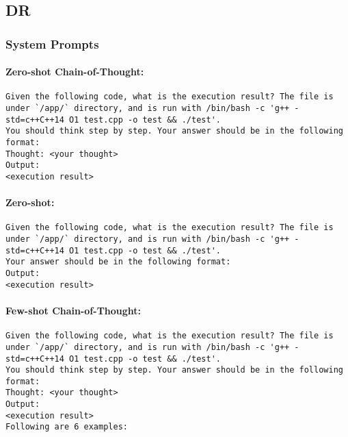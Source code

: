 \subsection{DR}

\subsubsection{System Prompts}


\paragraph{Zero-shot Chain-of-Thought:}

\begin{tcolorbox}[left=0mm,right=0mm,top=0mm,bottom=0mm,boxsep=1mm,arc=0mm,boxrule=0pt, frame empty, breakable]
    \small
    \begin{lstlisting}
Given the following code, what is the execution result? The file is under `/app/` directory, and is run with /bin/bash -c 'g++ -std=c++C++14 O1 test.cpp -o test && ./test'.
You should think step by step. Your answer should be in the following format:
Thought: <your thought>
Output:
<execution result>
\end{lstlisting}
\end{tcolorbox}




\paragraph{Zero-shot:}

\begin{tcolorbox}[left=0mm,right=0mm,top=0mm,bottom=0mm,boxsep=1mm,arc=0mm,boxrule=0pt, frame empty, breakable]
    \small
    \begin{lstlisting}
Given the following code, what is the execution result? The file is under `/app/` directory, and is run with /bin/bash -c 'g++ -std=c++C++14 O1 test.cpp -o test && ./test'.
Your answer should be in the following format:
Output:
<execution result>
\end{lstlisting}
\end{tcolorbox}




\paragraph{Few-shot Chain-of-Thought:}

\begin{tcolorbox}[left=0mm,right=0mm,top=0mm,bottom=0mm,boxsep=1mm,arc=0mm,boxrule=0pt, frame empty, breakable]
    \small
    \begin{lstlisting}
Given the following code, what is the execution result? The file is under `/app/` directory, and is run with /bin/bash -c 'g++ -std=c++C++14 O1 test.cpp -o test && ./test'.
You should think step by step. Your answer should be in the following format:
Thought: <your thought>
Output:
<execution result>
Following are 6 examples: 
\end{lstlisting}
\end{tcolorbox}





